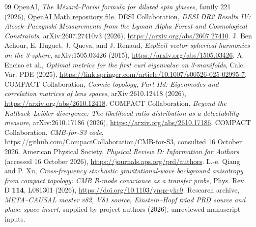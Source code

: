 \documentclass[aps,prd,onecolumn,notitlepage,groupedaddress,11pt]{revtex4-2}
\begin{document}
\begin{thebibliography}{99}
 OpenAI, \emph{The M\'ezard--Parisi formula for diluted spin glasses}, family 221 (2026), \href{https://github.com/openai/math/tree/main/preprints/The-Mezard-Parisi-formula-for-diluted-spin-glasses-September-23-2026}{OpenAI Math repository file}.
 DESI Collaboration, \emph{DESI DR2 Results IV: Alcock--Paczynski Measurements from the Lyman Alpha Forest and Cosmological Constraints}, arXiv:2607.27410v3 (2026), \url{https://arxiv.org/abs/2607.27410}.
 J. Ben Achour, E. Huguet, J. Queva, and J. Renaud, \emph{Explicit vector spherical harmonics on the 3-sphere}, arXiv:1505.03426 (2015), \url{https://arxiv.org/abs/1505.03426}.
 A. Enciso et al., \emph{Optimal metrics for the first curl eigenvalue on 3-manifolds}, Calc. Var. PDE (2025), \url{https://link.springer.com/article/10.1007/s00526-025-02995-7}.
 COMPACT Collaboration, \emph{Cosmic topology, Part IId: Eigenmodes and correlation matrices of lens spaces}, arXiv:2610.12418 (2026), \url{https://arxiv.org/abs/2610.12418}.
 COMPACT Collaboration, \emph{Beyond the Kullback--Leibler divergence: The likelihood-ratio distribution as a detectability measure}, arXiv:2610.17186 (2026), \url{https://arxiv.org/abs/2610.17186}.
 COMPACT Collaboration, \emph{CMB-for-S3 code}, \url{https://github.com/CompactCollaboration/CMB-for-S3}, consulted 16 October 2026.
 American Physical Society, \emph{Physical Review D: Information for Authors} (accessed 16 October 2026), \url{https://journals.aps.org/prd/authors}.
 L.-e. Qiang and P. Xu, \emph{Cross-frequency stochastic gravitational-wave background anisotropy from compact topology: CMB B-mode covariance as a transfer probe}, Phys. Rev. D \textbf{114}, L081301 (2026), \url{https://doi.org/10.1103/ynqz-ykc9}.
 Research archive, \emph{META--CAUSAL master v82, V81 source, Einstein--Hopf triad PRD source and phase-space insert}, supplied by project authors (2026), unreviewed manuscript inputs.


\end{thebibliography}
\end{document}
